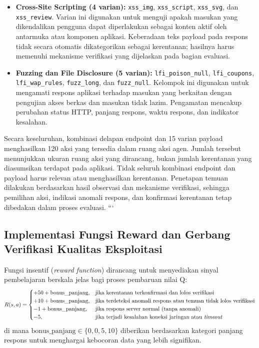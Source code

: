 \begin{enumerate}
\begin{itemize}
    \item \textbf{Cross-Site Scripting (4 varian):}
    \texttt{xss\_img}, \texttt{xss\_script},
    \texttt{xss\_svg}, dan \texttt{xss\_review}. Varian ini
    digunakan untuk menguji apakah masukan yang dikendalikan
    pengguna dapat diperlakukan sebagai konten aktif oleh
    antarmuka atau komponen aplikasi. Keberadaan teks payload
    pada respons tidak secara otomatis dikategorikan sebagai
    kerentanan; hasilnya harus memenuhi mekanisme verifikasi
    yang dijelaskan pada bagian evaluasi.

    \item \textbf{Fuzzing dan File Disclosure (5 varian):}
    \texttt{lfi\_poison\_null},
    \texttt{lfi\_coupons},
    \texttt{lfi\_wap\_rules},
    \texttt{fuzz\_long}, dan \texttt{fuzz\_null}. Kelompok ini
    digunakan untuk mengamati respons aplikasi terhadap masukan
    yang berkaitan dengan pengujian akses berkas dan masukan
    tidak lazim. Pengamatan mencakup perubahan status HTTP,
    panjang respons, waktu respons, dan indikator kesalahan.
\end{itemize}

Secara keseluruhan, kombinasi delapan endpoint dan 15 varian
payload menghasilkan 120 aksi yang tersedia dalam ruang aksi
agen. Jumlah tersebut menunjukkan ukuran ruang aksi yang
dirancang, bukan jumlah kerentanan yang diasumsikan terdapat
pada aplikasi. Tidak seluruh kombinasi endpoint dan payload
harus relevan atau menghasilkan kerentanan. Penetapan temuan
dilakukan berdasarkan hasil observasi dan mekanisme verifikasi,
sehingga pemilihan aksi, indikasi anomali respons, dan konfirmasi
kerentanan tetap dibedakan dalam proses evaluasi.
```


\subsection{Implementasi Fungsi Reward dan Gerbang Verifikasi Kualitas Eksploitasi}

Fungsi insentif (\textit{reward function}) dirancang untuk menyediakan sinyal pembelajaran berskala jelas bagi proses pembaruan nilai Q:
\begin{equation}
R(s, a) = 
\begin{cases}
+50 + \text{bonus\_panjang}, & \text{jika kerentanan terkonfirmasi dan lolos verifikasi} \\
+10 + \text{bonus\_panjang}, & \text{jika terdeteksi anomali respons atau temuan tidak lolos verifikasi} \\
-1 + \text{bonus\_panjang},  & \text{jika respons server normal (tanpa anomali)} \\
-5,                          & \text{jika terjadi kesalahan koneksi jaringan atau \textit{timeout}}
\end{cases}
\end{equation}
di mana $\text{bonus\_panjang} \in \{0, 0, 5, 10\}$ diberikan berdasarkan kategori panjang respons untuk menghargai kebocoran data yang lebih signifikan.


\end{enumerate}
